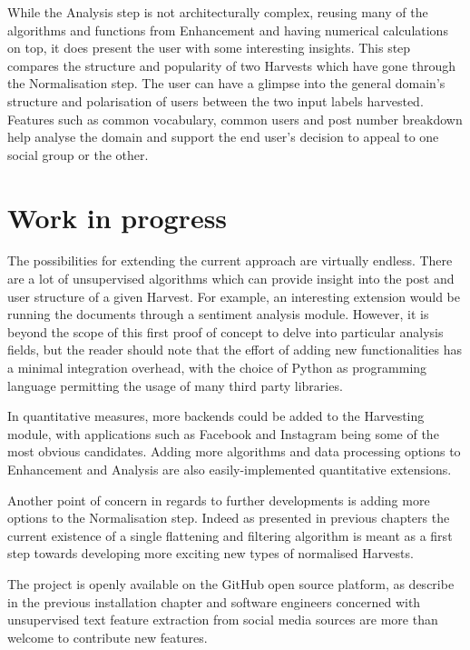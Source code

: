 \documentclass[12pt,a4paper,twoside]{report}
\begin{document}
While the Analysis step is not architecturally complex, reusing many of the algorithms and functions from Enhancement and having numerical calculations on top, it does present the user with some interesting insights. This step compares the structure and popularity of two Harvests which have gone through the Normalisation step. The user can have a glimpse into the general domain's structure and polarisation of users between the two input labels harvested. Features such as common vocabulary, common users and post number breakdown help analyse the domain and support the end user's decision to appeal to one social group or the other.

\section{Work in progress}
The possibilities for extending the current approach are virtually endless. There are a lot of unsupervised algorithms which can provide insight into the post and user structure of a given Harvest. For example, an interesting extension would be running the documents through a sentiment analysis module. However, it is beyond the scope of this first proof of concept to delve into particular analysis fields, but the reader should note that the effort of adding new functionalities has a minimal integration overhead, with the choice of Python as programming language permitting the usage of many third party libraries.

In quantitative measures, more backends could be added to the Harvesting module, with applications such as Facebook and Instagram being some of the most obvious candidates. Adding more algorithms and data processing options to Enhancement and Analysis are also easily-implemented quantitative extensions.

Another point of concern in regards to further developments is adding more options to the Normalisation step. Indeed as presented in previous chapters the current existence of a single flattening and filtering algorithm is meant as a first step towards developing more exciting new types of normalised Harvests.

The project is openly available on the GitHub open source platform, as describe in the previous installation chapter and software engineers concerned with unsupervised text feature extraction from social media sources are more than welcome to contribute new features.
\end{document}
